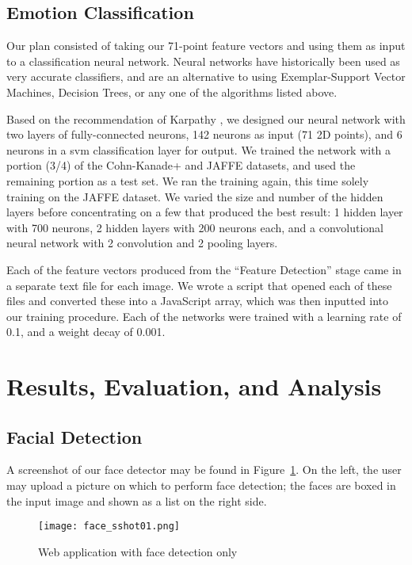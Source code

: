 \documentclass[10pt,twocolumn,letterpaper]{article}
\begin{document}
\subsection{Emotion Classification}

Our plan consisted of taking our 71-point feature vectors and using them as input to a classification neural network. Neural networks have historically been used as very accurate classifiers, and are an alternative to using Exemplar-Support Vector Machines, Decision Trees, or any one of the algorithms listed above. 

Based on the recommendation of Karpathy \cite{Karpathy}, we designed our neural network with two layers of fully-connected neurons, 142 neurons as input (71 2D points), and 6 neurons in a svm classification layer for output. We trained the network with a portion (3/4) of the Cohn-Kanade+ and JAFFE datasets, and used the remaining portion as a test set. We ran the training again, this time solely training on the JAFFE dataset. We varied the size and number of the hidden layers before concentrating on a few that produced the best result: 1 hidden layer with 700 neurons, 2 hidden layers with 200 neurons each, and a convolutional neural network with 2 convolution and 2 pooling layers.

Each of the feature vectors produced from the ``Feature Detection'' stage came in a separate text file for each image. We wrote a script that opened each of these files and converted these into a JavaScript array, which was then inputted into our training procedure. Each of the networks were trained with a learning rate of 0.1, and a weight decay of 0.001.

\section{Results, Evaluation, and Analysis}

\subsection{Facial Detection}

A screenshot of our face detector may be found in Figure~\ref{fig:face_sshot}. On the left, the user may upload a picture on which to perform face detection; the faces are boxed in the input image and shown as a list on the right side.

\begin{figure}
\centering
\texttt{[image: face\_sshot01.png]}
\caption{Web application with face detection only\label{fig:face_sshot}}
\end{figure}
\end{document}
